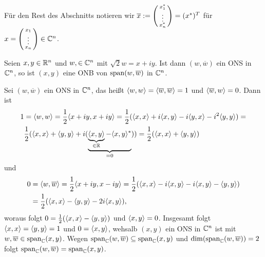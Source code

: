 \documentclass[../../main.tex]{subfiles}
\begin{document}
\begin{nt}\label{15.2.8}
Für den Rest des Abschnitts notieren wir $\overline{x}:=\left(\begin{smallmatrix}x_1^*\\\vdots\\x_n^*\end{smallmatrix}\right)=(x^*)^T$ für $x=\left(\begin{smallmatrix}x_1\\\vdots\\x_n\end{smallmatrix}\right)\in \mathbb C^n$.
\end{nt}

\begin{lem}\label{15.2.9}
Seien $x,y\in \mathbb R^n$ und $w,\in \mathbb C^n$ mit $\sqrt{2}w=x+iy$. Ist dann $(w,\overline{w})$ ein ONS in $\mathbb C^n$, so ist $(x,y)$ eine ONB von $\operatorname{span}(w,\overline{w})$ in $\mathbb C^n$.
\end{lem}
\begin{cproof}
Sei $(w,\overline{w})$ ein ONS in $\mathbb C^n$, das heißt $\langle w,w\rangle=\langle \overline{w},\overline{w}\rangle=1$ und $\langle \overline{w},w\rangle=0$. Dann ist
\begin{align*}
1&=\langle w,w\rangle=\frac{1}{2}\langle x+iy,x+iy\rangle=\frac{1}{2}(\langle x,x\rangle+i\langle x,y\rangle-i\langle y,x\rangle-i^2\langle y,y\rangle)=\\
&\frac{1}{2}(\langle x,x\rangle+\langle y,y\rangle+i(\underbrace{\underbrace{\langle x,y\rangle}_{\in \mathbb R}-\langle x,y\rangle^*}_{=0}))=\frac{1}{2}(\langle x,x\rangle+\langle y,y\rangle)
\end{align*}
und
\begin{align*}
0&=\langle w,\overline{w}\rangle=\frac{1}{2}\langle x+iy,x-iy\rangle=\frac{1}{2}(\langle x,x\rangle-i\langle x,y\rangle-i\langle x,y\rangle-\langle y,y\rangle)\\
&=\frac{1}{2}(\langle x,x\rangle-\langle y,y\rangle-2i\langle x,y\rangle),
\end{align*}
woraus folgt $0=\frac{1}{2}(\langle x,x\rangle-\langle y,y\rangle)$ und $\langle x,y\rangle=0$. Insgesamt folgt $\langle x,x\rangle=\langle y,y\rangle=1$ und $0=\langle x,y\rangle$, wehsalb $(x,y)$ ein ONS in $\mathbb C^n$ ist mit $w,\overline{w}\in\operatorname{span}_\mathbb C(x,y)$. Wegen $\operatorname{span}_\mathbb C(w,\overline{w})\subseteq\operatorname{span}_\mathbb C(x,y)$ und $\dim(\operatorname{span}_\mathbb C(w,\overline{w}))=2$ folgt $\operatorname{span}_\mathbb C(w,\overline{w})=\operatorname{span}_\mathbb C(x,y)$.
\end{cproof}
\end{document}
